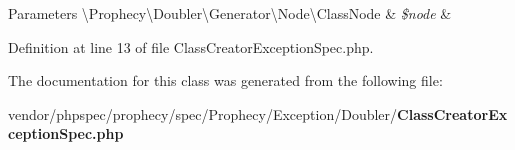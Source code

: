 \begin{DoxyParams}[1]{Parameters}
\textbackslash{}\+Prophecy\textbackslash{}\+Doubler\textbackslash{}\+Generator\textbackslash{}\+Node\textbackslash{}\+Class\+Node & {\em \$node} & \\
\hline
\end{DoxyParams}


Definition at line 13 of file Class\+Creator\+Exception\+Spec.\+php.



The documentation for this class was generated from the following file\+:\begin{DoxyCompactItemize}
\item 
vendor/phpspec/prophecy/spec/\+Prophecy/\+Exception/\+Doubler/{\bf Class\+Creator\+Exception\+Spec.\+php}\end{DoxyCompactItemize}
